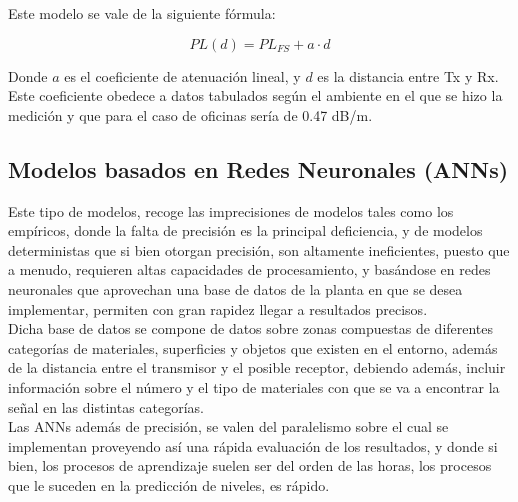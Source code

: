 Este modelo se vale de la siguiente fórmula:

\begin{equation}
PL(d) =  PL_{FS} + a\cdot{d}
\end{equation}

Donde $a$ es el coeficiente de atenuación lineal, y $d$ es la distancia entre Tx y Rx. Este coeficiente obedece a datos tabulados según el ambiente en el que se hizo la medición y que para el caso de oficinas sería de 0.47 dB/m. 


\subsection{Modelos basados en Redes Neuronales (ANNs)}{\label{redesneuronales}}

Este tipo de modelos, recoge las imprecisiones de modelos tales como los empíricos, donde la falta de precisión es la principal deficiencia, y de modelos deterministas que si bien otorgan precisión, son altamente ineficientes, puesto que a menudo, requieren altas capacidades de procesamiento, y basándose en redes neuronales que aprovechan una base de datos de la planta en que se desea implementar, permiten con gran rapidez llegar a resultados precisos. \\

Dicha base de datos se compone de datos sobre zonas compuestas de diferentes categorías de materiales, superficies y objetos que existen en el entorno, además de la distancia entre el transmisor y el posible receptor, debiendo además, incluir información sobre el número y el tipo de materiales con que se va a encontrar la señal en las distintas categorías.\\

Las ANNs además de precisión, se valen del paralelismo sobre el cual se implementan proveyendo así una rápida evaluación de los resultados, y donde si bien, los procesos de aprendizaje suelen ser del orden de las horas, los procesos que le suceden en la predicción de niveles, es rápido.